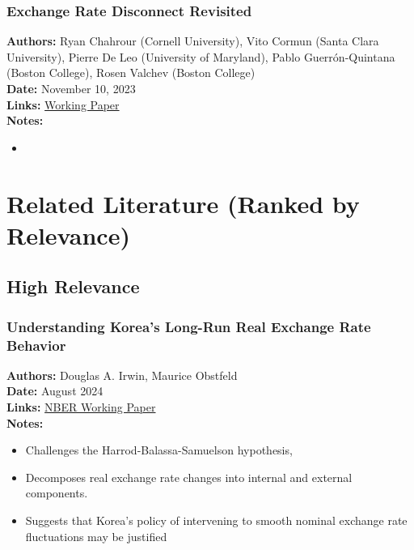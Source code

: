\documentclass[
  11pt,
]{article}
\providecommand{\tightlist}{%
  \setlength{\itemsep}{0pt}\setlength{\parskip}{0pt}}
\begin{document}
\subsubsection{Exchange Rate Disconnect
Revisited}\label{exchange-rate-disconnect-revisited}

\textbf{Authors:} Ryan Chahrour (Cornell University), Vito Cormun (Santa
Clara University), Pierre De Leo (University of Maryland), Pablo
Guerrón-Quintana (Boston College), Rosen Valchev (Boston College)\\
\textbf{Date:} November 10, 2023\\
\textbf{Links:}
\href{https://drive.google.com/file/d/1Di78Mg3vjuy0XLX3APJZYbzAxVlVmKp-/view?usp=sharing}{Working
Paper}\\
\textbf{Notes:}

\begin{itemize}
\tightlist
\item
\end{itemize}

\section{Related Literature (Ranked by
Relevance)}\label{related-literature-ranked-by-relevance}

\subsection{High Relevance}\label{high-relevance}

\subsubsection{Understanding Korea's Long-Run Real Exchange Rate
Behavior}\label{understanding-koreas-long-run-real-exchange-rate-behavior}

\textbf{Authors:} Douglas A. Irwin, Maurice Obstfeld\\
\textbf{Date:} August 2024\\
\textbf{Links:}
\href{https://www.nber.org/system/files/working_papers/w32769/w32769.pdf}{NBER
Working Paper}\\
\textbf{Notes:}

\begin{itemize}
\tightlist
\item
  Challenges the Harrod-Balassa-Samuelson hypothesis,
\item
  Decomposes real exchange rate changes into internal and external
  components.
\item
  Suggests that Korea's policy of intervening to smooth nominal exchange
  rate fluctuations may be justified
\end{itemize}
\end{document}
